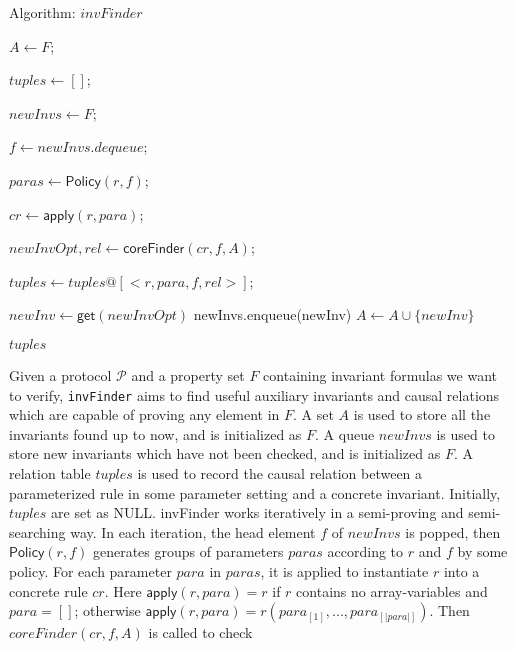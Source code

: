 \documentclass[conference]{IEEEtran}
\begin{document}
\begin{algorithm}\label{alg:invFinder}

\caption{Algorithm: $invFinder$}\label{alg:invfinder}



{
    $A\leftarrow F$;

    $tuples \leftarrow []$;

    $newInvs \leftarrow F$;

    {
   $ f \leftarrow newInvs.dequeue$;

   { $paras \leftarrow \mathsf{Policy}(r,f)$;

     {$cr \leftarrow \mathsf{apply}(r,para)$;

       $newInvOpt,rel \leftarrow \mathsf{coreFinder}(cr,  f, A)$;

        $tuples \leftarrow tuples @[<r, para, f, rel>]$;

        {$newInv \leftarrow \mathsf{get}(newInvOpt)$\;
         newInvs.enqueue(newInv)\;
        $A \leftarrow A \cup \{newInv\}$\;
        }

     }
   }
  }
\Return $tuples$\;
}


\end{algorithm}
Given a protocol $\mathcal{P}$ and a property set $F$ containing invariant formulas we want to verify, {\tt invFinder} aims to find useful auxiliary invariants and causal relations which are capable of proving any element in $F$.  A set $A$ is used to store all the invariants found up to now, and is initialized as  $F$. A queue  $newInvs$ is used to store new invariants which have not been checked,  and  is initialized as  $F$.  A relation table $tuples$ is used to record the causal relation between a parameterized rule in some parameter setting and a concrete invariant. Initially,  $tuples$ are set as NULL.
{\sf invFinder}  works iteratively in a semi-proving and semi-searching way. In each iteration, the head element $f$ of $newInvs$ is popped,  then $\mathsf{Policy}(r,f)$  generates groups of parameters $paras$  according to $r$ and $f$ by some policy. For each parameter $para$ in $paras$,   it is applied to instantiate $r$ into a concrete rule $cr$.  Here  $\mathsf{apply}(r,para)=r$ if $r$ contains no array-variables and $para=[]$; otherwise $\mathsf{apply}(r,para)=r(para_{[1]},..., para_{[|para|]})$. Then $coreFinder(cr,  f, A)$ is called to check
\end{document}
